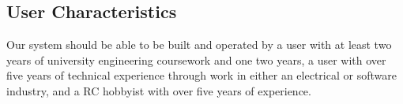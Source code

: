 \documentclass[compsoc,draftclsnofoot,onecolumn,10pt]{IEEEtran}
\begin{document}
\subsection{User Characteristics}
Our system should be able to be built and operated by a user with at least two 
years of university engineering coursework and one two years, a user with over 
five years of technical experience through work in either an electrical or software 
industry, and a RC hobbyist with over five years of experience. 
\end{document}

